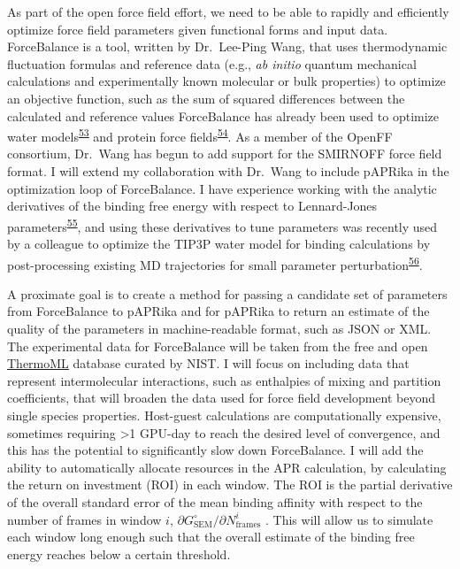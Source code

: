 \documentclass[11pt,notitlepage]{article}
\begin{document}
As part of the open force field effort, we need to be able to rapidly
and efficiently optimize force field parameters given functional forms
and input data. ForceBalance is a tool, written by Dr.~Lee-Ping Wang,
that uses thermodynamic fluctuation formulas and reference data (e.g.,
\emph{ab initio} quantum mechanical calculations and experimentally
known molecular or bulk properties) to optimize an objective function,
such as the sum of squared differences between the calculated and
reference values ForceBalance has already been used to optimize water
models\textsuperscript{\protect\hyperlink{ref-50lAQZra}{53}} and protein
force fields\textsuperscript{\protect\hyperlink{ref-1E3wArY0j}{54}}. As
a member of the OpenFF consortium, Dr.~Wang has begun to add support for
the SMIRNOFF force field format. I will extend my collaboration with
Dr.~Wang to include pAPRika in the optimization loop of ForceBalance. I
have experience working with the analytic derivatives of the binding
free energy with respect to Lennard-Jones
parameters\textsuperscript{\protect\hyperlink{ref-xRauI5mb}{55}}, and
using these derivatives to tune parameters was recently used by a
colleague to optimize the TIP3P water model for binding calculations by
post-processing existing MD trajectories for small parameter
perturbation\textsuperscript{\protect\hyperlink{ref-NeqIQDLp}{56}}.

A proximate goal is to create a method for passing a candidate set of
parameters from ForceBalance to pAPRika and for pAPRika to return an
estimate of the quality of the parameters in machine-readable format,
such as JSON or XML. The experimental data for ForceBalance will be
taken from the free and open
\href{https://www.nist.gov/mml/acmd/trc/thermoml}{ThermoML} database
curated by NIST. I will focus on including data that represent
intermolecular interactions, such as enthalpies of mixing and partition
coefficients, that will broaden the data used for force field
development beyond single species properties. Host-guest calculations
are computationally expensive, sometimes requiring \textgreater{}1
GPU-day to reach the desired level of convergence, and this has the
potential to significantly slow down ForceBalance. I will add the
ability to automatically allocate resources in the APR calculation, by
calculating the return on investment (ROI) in each window. The ROI is
the partial derivative of the overall standard error of the mean binding
affinity with respect to the number of frames in window \(i\),
\(\partial G^\circ_\text{SEM} / \partial N^i_\text{frames}\) . This will
allow us to simulate each window long enough such that the overall
estimate of the binding free energy reaches below a certain threshold.
\end{document}
